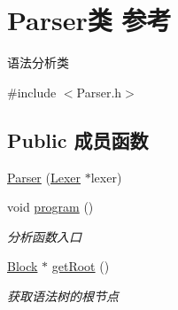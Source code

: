 \hypertarget{class_parser}{}\section{Parser类 参考}
\label{class_parser}


语法分析类  




{\ttfamily \#include $<$Parser.\+h$>$}

\subsection*{Public 成员函数}
\begin{DoxyCompactItemize}
\item 
\hyperlink{class_parser_a25929f4bcec5c5ff010218f001203b73}{Parser} (\hyperlink{class_lexer}{Lexer} $\ast$lexer)
\item 
void \hyperlink{class_parser_af213985eb12738d0dbf7d505a8795ea2}{program} ()\hypertarget{class_parser_af213985eb12738d0dbf7d505a8795ea2}{}\label{class_parser_af213985eb12738d0dbf7d505a8795ea2}

\begin{DoxyCompactList}\small\item\em 分析函数入口 \end{DoxyCompactList}\item 
\hyperlink{class_block}{Block} $\ast$ \hyperlink{class_parser_ad05b2f1f2e9f60a7373961da0588eb5b}{get\+Root} ()\hypertarget{class_parser_ad05b2f1f2e9f60a7373961da0588eb5b}{}\label{class_parser_ad05b2f1f2e9f60a7373961da0588eb5b}

\begin{DoxyCompactList}\small\item\em 获取语法树的根节点 \end{DoxyCompactList}\end{DoxyCompactItemize}
